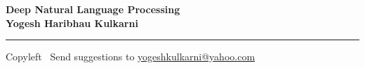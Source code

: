 
\graphicspath{{images/}}

\footnotesize


\begin{center}
\Large{\textbf{Deep Natural Language Processing\\ Yogesh Haribhau Kulkarni}}  
\end{center}

\begin{multicols}{2}

\end{multicols}

\rule{\linewidth}{0.25pt}
\scriptsize
Copyleft \textcopyleft\  Send suggestions to 
\href{http://yati.io}{yogeshkulkarni@yahoo.com}


